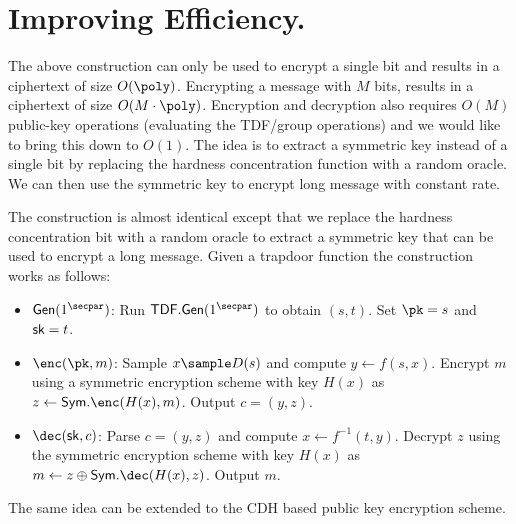 \section{Improving Efficiency.}
The above construction can only be used to encrypt a single bit and results in a ciphertext of size $O(\poly)$. Encrypting a message with $M$ bits, results in a ciphertext of size $O(M \cdot \poly)$. Encryption and decryption also requires $O(M)$ public-key operations (evaluating the TDF/group operations) and we would like to bring this down to $O(1)$. The idea is to extract a symmetric key instead of a single bit by replacing the hardness concentration function with a random oracle. We can then use the symmetric key to encrypt long message with constant rate.

The construction is almost identical except that we replace the hardness concentration bit with a random oracle to extract a symmetric key that can be used to encrypt a long message. Given a trapdoor function the construction works as follows:
\begin{itemize}
    \item $\gen(1^\secpar)$: Run $\mathsf{TDF}.\gen(1^\secpar)$ to obtain $(s,t)$. Set $\pk = s$ and $\mathsf{sk} = t$.
    \item $\enc(\pk, m)$: Sample $x \sample D(s)$ and compute $y \gets f(s, x)$. Encrypt $m$ using a symmetric encryption scheme with key $H(x)$ as $z \gets \mathsf{Sym}.\enc(H(x), m)$. Output $c = (y, z)$.
    \item $\dec(\sk, c)$: Parse $c = (y, z)$ and compute $x \gets f^{-1}(t, y)$. Decrypt $z$ using the symmetric encryption scheme with key $H(x)$ as $m \gets z \oplus \mathsf{Sym}.\dec(H(x), z)$. Output $m$.
\end{itemize}
The same idea can be extended to the CDH based public key encryption scheme.

